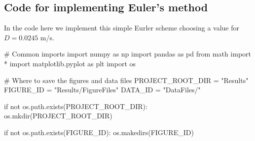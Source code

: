 \documentclass[%
oneside,                 %
final,                   %
10pt]{article}
\begin{document}
\subsection{Code for implementing Euler's method}
In the code here we implement this simple Eurler scheme choosing a value for $D=0.0245$ m/s. 




















































































\bpycod
# Common imports
import numpy as np
import pandas as pd
from math import *
import matplotlib.pyplot as plt
import os

# Where to save the figures and data files
PROJECT_ROOT_DIR = "Results"
FIGURE_ID = "Results/FigureFiles"
DATA_ID = "DataFiles/"

if not os.path.exists(PROJECT_ROOT_DIR):
    os.mkdir(PROJECT_ROOT_DIR)

if not os.path.exists(FIGURE_ID):
    os.makedirs(FIGURE_ID)
\end{document}
